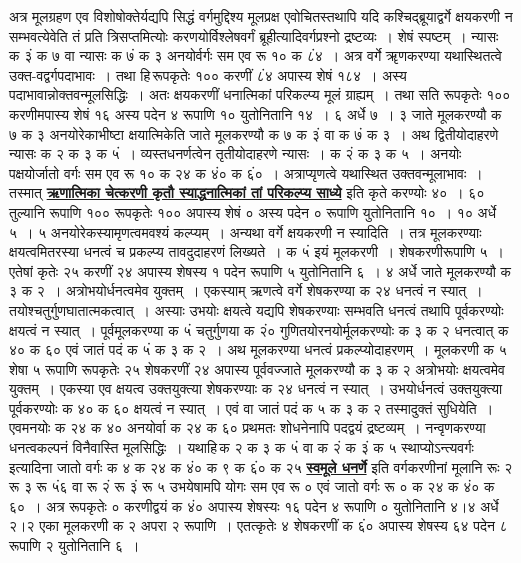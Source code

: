 \documentclass[11pt, openany]{book}
\begin{document}
{{ अत्र मूलग्रहण एव विशोषोक्तेर्यद्यपि सिद्धं वर्गमुद्दिश्य मूलप्रक्ष एवोचितस्तथापि
यदि कश्चिद्ब्रूयाद्वर्गे क्षयकरणी न सम्भवत्येवेति तं प्रति
त्रिसप्तमित्योः करणयोर्विश्लेषवर्गं ब्रूहीत्यादिवर्गप्रश्नो द्रष्टव्यः~। शेषं स्पष्टम्~। न्यासः क ३ं क ७ वा न्यासः क ७ं क ३ अनयोर्वर्गः सम एव रू १० क ८ं४~। अत्र वर्गे ॠणकरण्या यथास्थितत्वे उक्त-वद्वर्गपदाभावः~। तथा हि\textendash \,रूपकृतेः १०० करणीं ८ं४ अपास्य शेषं १८४~। अस्य
पदाभावान्नोक्तवन्मूलसिद्धिः~। अतः क्षयकरणीं धनात्मिकां परिकल्प्य मूलं ग्राह्यम्~। 
तथा सति रूपकृतेः १०० करणीमपास्य शेषं १६ अस्य पदेन ४ रूपाणि १० 
युतोनितानि १४~। ६ अर्धे ७~। ३ जाते मूलकरण्यौ क ७ क ३ अनयोरेकाभीष्टा 
क्षयात्मिकेति जाते मूलकरण्यौ क ७ क ३ं वा क ७ं क ३~। अथ द्वितीयोदाहरणे 
न्यासः क २ क ३ क ५ं~। व्यस्तधनर्णत्वेन तृतीयोदाहरणे न्यासः~। क २ं क ३ क ५~। अनयोः पक्षयोर्जातो वर्गः सम एव रू १० क २४ क ४ं० क ६ं०~। अत्राप्यृणत्वे यथास्थित उक्तवन्मूलाभावः~। तस्मात् 
\hyperref[42]{\textbf{ऋणात्मिका चेत्करणी कृतौ स्याद्धनात्मिकां तां परिकल्प्य साध्ये}} इति कृते करण्योः 
४०~। ६० तुल्यानि रूपाणि १०० रूपकृतेः १०० अपास्य शेषं ० अस्य पदेन ० 
रूपाणि युतोनितानि १०~। १० अर्धे ५~। ५ अनयोरेकस्यामृणत्वमवश्यं कल्प्यम्~। 
अन्यथा वर्गे क्षयकरणी न स्यादिति~। तत्र मूलकरण्याः क्षयत्वमितरस्या
धनत्वं च प्रकल्प्य तावदुदाहरणं लिख्यते~। क ५ं इयं मूलकरणी~। शेषकरणीरूपाणि ५~। एतेषां कृतेः २५ करणीं २४ अपास्य शेषस्य १ पदेन रूपाणि ५ युतोनितानि ६~। ४ अर्धे जाते मूलकरण्यौ क ३ क २~। अत्रोभयोर्धनत्वमेव युक्तम्~। एकस्याम् 
ऋणत्वे वर्गे शेषकरण्या क २४ धनत्वं न स्यात्~। तयोश्चतुर्गुणघातात्मकत्वात्~। 
अस्याः उभयोः क्षयत्वे यद्यपि शेषकरण्याः सम्भवति धनत्वं तथापि
पूर्वकरण्योः क्षयत्वं न स्यात्~। पूर्वमूलकरण्या क ५ं चतुर्गुणया क २ं०
गुणितयोरनयोर्मूलकरण्योः 
क ३ क २ धनत्वात् क ४० क ६० एवं जातं पदं क ५ं क ३ क २~।
अथ मूलकरण्या धनत्वं प्रकल्प्योदाहरणम्~। मूलकरणी क ५ शेषा ५ रूपाणि
रूपकृतेः २५ शेषकरणीं २४ अपास्य पूर्ववज्जाते मूलकरण्यौ क ३ क २ अत्रोभयोः
\newpage
\noindent क्षयत्वमेव युक्तम्~। एकस्या एव क्षयत्व उक्तयुक्त्या शेषकरण्याः क २४ धनत्वं न स्यात्~। उभयोर्धनत्वं उक्तयुक्त्या पूर्वकरण्योः क ४० क ६० क्षयत्वं न स्यात्~। एवं वा जातं पदं क ५ क ३ क २ तस्मादुक्तं सुधियेति~। एवमनयोः क २४ क 
४० अनयोर्वा क २४ क ६० प्रथमतः शोधनेनापि पदद्वयं द्रष्टव्यम्~।
नन्वृणकरण्या धनत्वकल्पनं विनैवास्ति मूलसिद्धिः~। यथाहि\textendash \,क २ क ३ क ५ं
वा क २ं क ३ं  क ५ {\qt स्थाप्योऽन्त्यवर्गः} इत्यादिना जातो वर्गः क ४ क २४ क ४ं० क ९ क ६ं० 
क २५ \hyperref[13]{\textbf{स्वमूले धनर्णे}} इति वर्गकरणीनां मूलानि रूः २ रू ३ रू ५ं६ वा रू २ं रू ३ं रू ५ उभयेषामपि योगः सम एव रू ० एवं जातो वर्गः रू ० क २४ क ४ं० क ६०~।
अत्र रूपकृतेः ० करणीद्वयं क ४ं० अपास्य शेषस्यः १६ पदेन ४ रूपाणि ०
युतोनितानि  ४।४ अर्धे २।२ एका मूलकरणी क २ अपरा २ रूपाणि~। एतत्कृतेः ४ शेषकरणीं क ६ं० अपास्य शेषस्य ६४ पदेन ८ रूपाणि २ युतोनितानि ६~। 
}}
\end{document}
